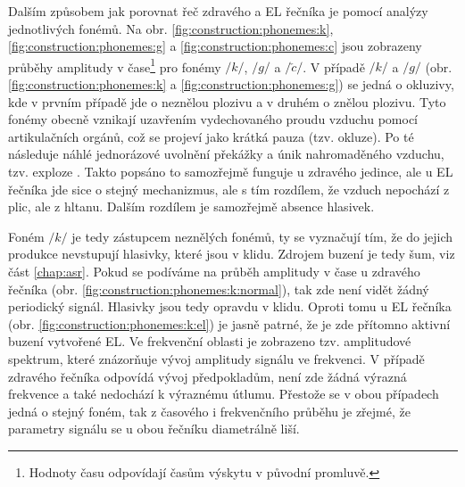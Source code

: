 Dalším způsobem jak porovnat řeč zdravého a EL řečníka je pomocí analýzy jednotlivých fonémů. Na obr. \ref{fig:construction:phonemes:k}, \ref{fig:construction:phonemes:g} a \ref{fig:construction:phonemes:c} jsou zobrazeny průběhy amplitudy v čase\footnote{Hodnoty času odpovídají časům výskytu v původní promluvě.} pro fonémy $/k/$, $/g/$ a $/\check{c}/$. V případě $/k/$ a $/g/$ (obr. \ref{fig:construction:phonemes:k} a \ref{fig:construction:phonemes:g}) se jedná o okluzivy, kde v prvním případě jde o neznělou plozivu a v druhém o znělou plozivu. Tyto fonémy obecně vznikají uzavřením vydechovaného proudu vzduchu pomocí artikulačních orgánů, což se projeví jako krátká pauza (tzv. okluze). Po té následuje náhlé jednorázové uvolnění překážky a únik nahromaděného vzduchu, tzv. exploze \cite{Psutka2006}. Takto popsáno to samozřejmě funguje u zdravého jedince, ale u EL řečníka jde sice o stejný mechanizmus, ale s tím rozdílem, že vzduch nepochází z plic, ale z hltanu. Dalším rozdílem je samozřejmě absence hlasivek.

Foném $/k/$ je tedy zástupcem neznělých fonémů, ty se vyznačují tím, že do jejich produkce nevstupují hlasivky, které jsou v klidu. Zdrojem buzení je tedy šum, viz část \ref{chap:asr}. Pokud se podíváme na průběh amplitudy v čase u zdravého řečníka (obr. \ref{fig:construction:phonemes:k:normal}), tak zde není vidět žádný periodický signál. Hlasivky jsou tedy opravdu v klidu. Oproti tomu u EL řečníka (obr. \ref{fig:construction:phonemes:k:el}) je jasně patrné, že je zde přítomno aktivní buzení vytvořené EL. Ve frekvenční oblasti je zobrazeno tzv. amplitudové spektrum, které znázorňuje vývoj amplitudy signálu ve frekvenci. V případě zdravého řečníka odpovídá vývoj předpokladům, není zde žádná výrazná frekvence a také nedochází k výraznému útlumu. Přestože se v obou případech jedná o stejný foném, tak z časového i frekvenčního průběhu je zřejmé, že parametry signálu se u obou řečníku diametrálně liší.

